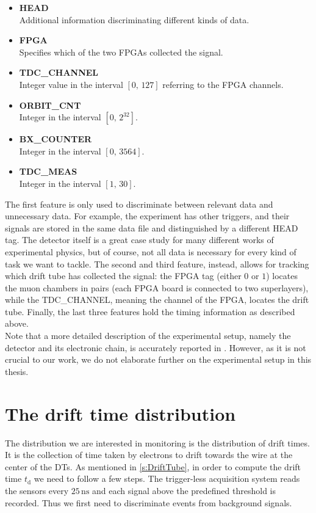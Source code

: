 \begin{itemize}
    \item \textbf{HEAD} \\ Additional information discriminating different kinds of data. 
    \item \textbf{FPGA} \\ Specifies which of the two FPGAs collected the signal.
    \item \textbf{TDC\_CHANNEL} \\ Integer value in the interval $[0,\,127]$ referring to the FPGA channels.
    \item \textbf{ORBIT\_CNT} \\ Integer in the interval $[0,\,2^{32}]$. 
    \item \textbf{BX\_COUNTER} \\ Integer in the interval $[0,\,3564]$. 
    \item \textbf{TDC\_MEAS} \\ Integer in the interval $[1,\,30]$.
\end{itemize}

The first feature is only used to discriminate between relevant data and unnecessary data. For example, the experiment
has other triggers, and their signals are stored in the same data file and distinguished by a different HEAD tag. The
detector itself is a great case study for many different works of experimental physics, but of course, not all data is
necessary for every kind of task we want to tackle. The second and third feature, instead, allows for tracking which
drift tube has collected the signal: the FPGA tag (either $0$ or $1$) locates the muon chambers in pairs (each FPGA
board is connected to two superlayers), while the TDC\_CHANNEL, meaning the channel of the FPGA, locates the drift tube.
Finally, the last three features hold the timing information as described above.  \\

Note that a more detailed description of the experimental setup, namely the detector and its electronic chain, is
accurately reported in \cite{migliorini}. However, as it is not crucial to our work, we do not elaborate further on the
experimental setup in this thesis.

\section{The drift time distribution}
\label{s:DriftTime}

The distribution we are interested in monitoring is the distribution of drift times. It is the collection of time taken
by electrons to drift towards the wire at the center of the DTs. As mentioned in \autoref{s:DriftTube}, in order to
compute the drift time $t_{\text{d}}$ we need to follow a few steps. The trigger-less acquisition system reads the
sensors every $25\,\si{\ns}$ and each signal above the predefined threshold is recorded. Thus we first need to
discriminate events from background signals.

